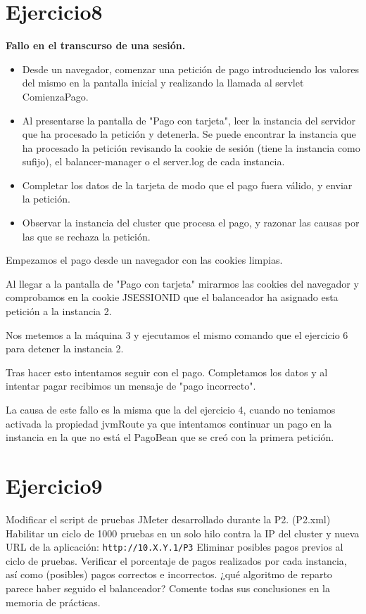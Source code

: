 \documentclass[a4paper, 10pt]{article}
\begin{document}
\section{Ejercicio8}
\begin{mdframed}
	 \textbf{Fallo en el transcurso de una sesión.}
	 \begin{itemize}
	  \item Desde un navegador, comenzar una petición de pago introduciendo los valores del mismo en la
	  pantalla inicial y realizando la llamada al servlet ComienzaPago.
	  \item Al presentarse la pantalla de "Pago con tarjeta", leer la instancia del servidor que ha procesado la
	  petición y detenerla. Se puede encontrar la instancia que ha procesado la petición revisando la
	  cookie de sesión (tiene la instancia como sufijo), el balancer-manager o el server.log de cada
	  instancia.
	  \item Completar los datos de la tarjeta de modo que el pago fuera válido, y enviar la petición.
	  \item Observar la instancia del cluster que procesa el pago, y razonar las causas por las que se rechaza
	  la petición. 	
	 \end{itemize}
	
\end{mdframed}

Empezamos el pago desde un navegador con las cookies limpias.

Al llegar a la pantalla de "Pago con tarjeta" mirarmos las cookies del navegador y comprobamos en la cookie JSESSIONID que el balanceador ha asignado esta petición a la instancia 2.

Nos metemos a la máquina 3 y ejecutamos el mismo comando que el ejercicio 6 para detener la instancia 2.

Tras hacer esto intentamos seguir con el pago. Completamos los datos y al intentar pagar recibimos un mensaje de "pago incorrecto".

La causa de este fallo es la misma que la del ejercicio 4, cuando no teniamos activada la propiedad jvmRoute ya que intentamos continuar un pago en la instancia en la que no está el PagoBean que se creó con la primera petición.
\newpage
\section{Ejercicio9}
\begin{mdframed}
	Modificar el script de pruebas JMeter desarrollado durante la P2. (P2.xml) Habilitar un ciclo de
	1000 pruebas en un solo hilo contra la IP del cluster y nueva URL de la aplicación:
	\texttt{http://10.X.Y.1/P3}
	Eliminar posibles pagos previos al ciclo de pruebas. Verificar el porcentaje de pagos realizados por cada
	instancia, así como (posibles) pagos correctos e incorrectos. ¿qué algoritmo de reparto parece haber
	seguido el balanceador? Comente todas sus conclusiones en la memoria de prácticas. 
\end{mdframed}
\end{document}
